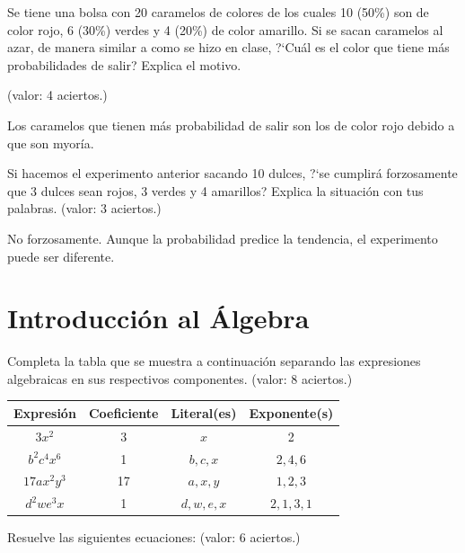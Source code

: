 \documentclass[11pt]{article}
\begin{document}
\vspace{1cm}
Se tiene una bolsa con 20 caramelos de colores de los cuales 10 (50\%) son de
color rojo, 6 (30\%) verdes y 4 (20\%) de color amarillo. Si se sacan caramelos
al azar, de manera similar a como se hizo en clase, ?`Cu\'al es el color que
tiene m\'as probabilidades de salir? Explica el motivo. 

\hfill(valor: 4 aciertos.)

\vspace{5mm}
Los caramelos que tienen m\'as probabilidad de salir son los de color rojo
debido a que son myor\'ia.


\newpage
Si hacemos el experimento anterior sacando 10 dulces, ?`se cumplir\'a
forzosamente que 3 dulces sean rojos, 3 verdes y 4 amarillos? Explica la
situaci\'on con tus palabras. \hfill(valor: 3 aciertos.)

\vspace{5mm}
No forzosamente. Aunque la probabilidad predice la tendencia, el experimento
puede ser diferente.


\vspace{1cm}
\section{Introducci\'on al \'Algebra} %
\label{sec:introducci'on_al_'algebra}

Completa la tabla que se muestra a continuaci\'on separando las expresiones
algebraicas en sus respectivos componentes. \hfill(valor: 8 aciertos.)

\begin{center}
\bgroup
\def\arraystretch{2}
\begin{tabular}{|c|c|c|c|}
\hline
Expresi\'on & Coeficiente & Literal(es) & Exponente(s)  \\ \hline 
$3x^2$ &3 &$x$ &2\\ \hline
$b^2c^4x^6$ &1 &$b,c,x$   &$2,4,6$\\ \hline
$17ax^2y^3$ &17 &$a,x,y$  &$1,2,3$\\ \hline
$d^2we^3x$  &1 &$d,w,e,x$ &$2,1,3,1$\\ \hline
\end{tabular}
\egroup
\end{center}

\vspace{5mm}
Resuelve las siguientes ecuaciones: \hfill(valor: 6 aciertos.)
\end{document}
